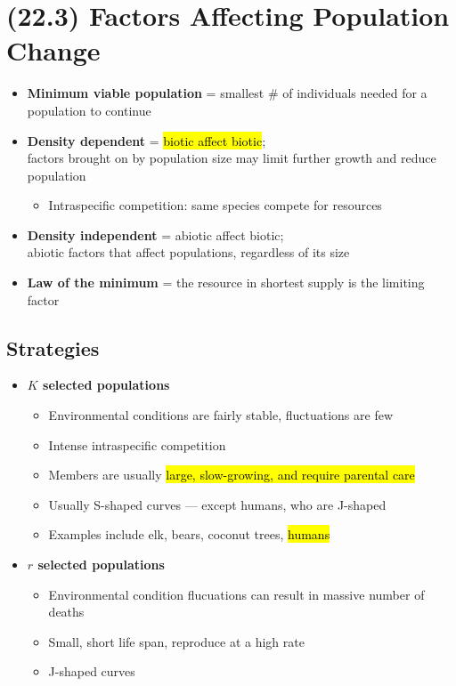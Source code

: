 \documentclass[a4paper,12pt]{article}
\begin{document}
\section{(22.3) Factors Affecting Population Change}
\begin{itemize}
    \item{\textbf{Minimum viable population} = smallest \# of individuals needed for a population to continue}
    \item{
            \textbf{Density dependent} = \hl{biotic affect biotic}; \\ factors brought on by population size may limit further growth and reduce population
            \begin{itemize}
                \item{Intraspecific competition: same species compete for resources}
            \end{itemize}
        }
    \item{\textbf{Density independent} = abiotic affect biotic; \\ abiotic factors that affect populations, regardless of its size}
    \item{\textbf{Law of the minimum} = the resource in shortest supply is the limiting factor}
\end{itemize}

\subsection{Strategies}
\begin{itemize}
    \item{
            \textbf{$K$ selected populations}
            \begin{itemize}
                \item{Environmental conditions are fairly stable, fluctuations are few}
                \item{Intense intraspecific competition}
                \item{Members are usually \hl{large, slow-growing, and require parental care}}
                \item{Usually S-shaped curves --- except humans, who are J-shaped}
                \item{Examples include elk, bears, coconut trees, \hl{humans}}
            \end{itemize}
        }
    \item{
            \textbf{$r$ selected populations}
            \begin{itemize}
                \item{Environmental condition flucuations can result in massive number of deaths}
                \item{Small, short life span, reproduce at a high rate}
                \item{J-shaped curves}
            \end{itemize}
        }
\end{itemize}
\end{document}
